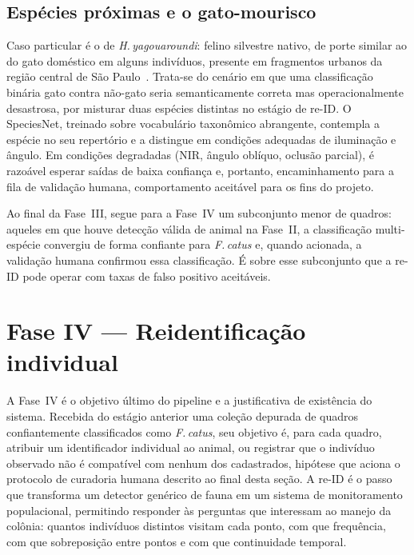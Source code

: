 \subsection*{Espécies próximas e o gato-mourisco}

Caso particular é o de \textit{H.\,yagouaroundi}: felino silvestre nativo, de porte similar ao do gato doméstico em alguns indivíduos, presente em fragmentos urbanos da região central de São Paulo~\cite{goncalves2025wildcat}. Trata-se do cenário em que uma classificação binária gato contra não-gato seria semanticamente correta mas operacionalmente desastrosa, por misturar duas espécies distintas no estágio de re-ID. O SpeciesNet, treinado sobre vocabulário taxonômico abrangente, contempla a espécie no seu repertório e a distingue em condições adequadas de iluminação e ângulo. Em condições degradadas (NIR, ângulo oblíquo, oclusão parcial), é razoável esperar saídas de baixa confiança e, portanto, encaminhamento para a fila de validação humana, comportamento aceitável para os fins do projeto.

Ao final da Fase~III, segue para a Fase~IV um subconjunto menor de quadros: aqueles em que houve detecção válida de animal na Fase~II, a classificação multi-espécie convergiu de forma confiante para \textit{F.\,catus} e, quando acionada, a validação humana confirmou essa classificação. É sobre esse subconjunto que a re-ID pode operar com taxas de falso positivo aceitáveis.

\section{Fase IV --- Reidentificação individual}
\label{sec:pipeline-fase4}

A Fase~IV é o objetivo último do pipeline e a justificativa de existência do sistema. Recebida do estágio anterior uma coleção depurada de quadros confiantemente classificados como \textit{F.\,catus}, seu objetivo é, para cada quadro, atribuir um identificador individual ao animal, ou registrar que o indivíduo observado não é compatível com nenhum dos cadastrados, hipótese que aciona o protocolo de curadoria humana descrito ao final desta seção. A re-ID é o passo que transforma um detector genérico de fauna em um sistema de monitoramento populacional, permitindo responder às perguntas que interessam ao manejo da colônia: quantos indivíduos distintos visitam cada ponto, com que frequência, com que sobreposição entre pontos e com que continuidade temporal.

